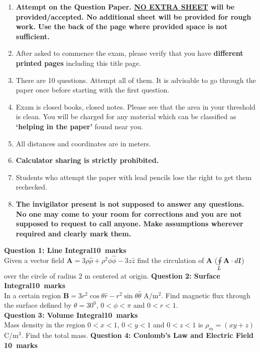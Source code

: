 \documentclass[12pt,a4paper]{article}
\def\QOne{10}
\def\Qtwo{10}
\def\Qthree{10}
\def\Qfour{10}
\begin{document}
\begin{enumerate}
\item \textbf{Attempt on the Question Paper. \underline{NO EXTRA SHEET} will be provided/accepted. No
additional sheet will be provided for rough work. Use the back of the page where
provided space is not sufficient.}
\item After asked to commence the exam, please verify that you have \textbf{\pageref{LastPage} different
printed pages} including this title page.
\item There are 10 questions. Attempt all of them. It is advisable to go through the paper once
before starting with the first question.
\item Exam is closed books, closed notes. Please see that the area in your threshold is clean.
You will be charged for any material which can be classified as \textbf{`helping in the paper'}
found near you.
\item All distances and coordinates are in meters.
\item \textbf{Calculator sharing is strictly prohibited.}
\item Students who attempt the paper with lead pencils lose the right to get them rechecked.
\item \textbf{The invigilator present is not supposed to answer any questions. No one may come
to your room for corrections and you are not supposed to request to call anyone.
Make assumptions wherever required and clearly mark them.}
\end{enumerate}
\newpage
\noindent\textbf{Question 1: Line Integral\hfill \QOne~marks}\\
Given a vector field $\textbf{A}=3\rho\hat\rho+\rho^2\phi\hat\phi-3z\hat z$ find the circulation of \textbf{A} ($\oint\limits_{L} \textbf{A}\cdot d\textbf{\textit{l}}$) over the circle of radius $2$ m centered at origin.
\newpage
\noindent \textbf{Question 2: Surface Integral\hfill \Qtwo~marks}\\
In a certain region $\textbf{B}=3r^2\cos\theta\hat r -r^2\sin\theta\hat\theta$ A/m$^2$. Find magnetic flux through the surface defined by $\theta=30^0$, $0<\phi<\pi$ and $0<r<1$.\\
\newpage
\noindent \textbf{Question 3: Volume Integral\hfill \Qthree~marks}\\
Mass density in the region $0<x<1$, $0<y<1$ and $0<z<1$ is $\rho_m=(xy+z)$ C/m$^3$. Find the total mass.
\newpage
\noindent\textbf{Question 4: Coulomb's Law and Electric Field \hfill \Qfour~marks}\\
\end{document}
